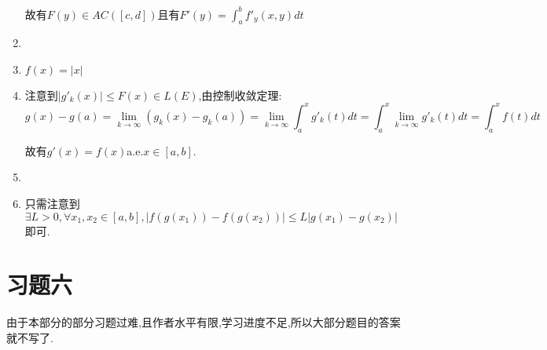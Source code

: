 \documentclass[UTF8, a4paper, 12pt, oneside, onecolumn]{article}
\numberwithin{equation}{section}
\numberwithin{figure}{section}
\numberwithin{table}{section}
\theoremstyle{nonumberplain}	%
\theoremstyle{plain}	%
\theoremstyle{plain}	%
\theoremstyle{plain}	%
\theoremstyle{plain}	%
\theoremstyle{nonumberplain}
\begin{document}
\begin{enumerate}
	故有$F(y)\in AC([c,d])$且有$\displaystyle F'(y)=\int_{a}^{b} f'_y(x,y)dt $
	\item %
	\item $\displaystyle f(x)=|x|$
	\item 注意到$|g'_k(x)|\leqslant F(x)\in L(E)$,由控制收敛定理:
	$$\displaystyle g(x)-g(a)=\lim_{k\rightarrow \infty}( g_k(x)-g_k(a) )=\lim_{k\rightarrow \infty}\int_a^x g'_k(t)dt=\int_a^x\lim_{k\rightarrow \infty} g'_k(t)dt=\int_a^x f(t)dt$$
	
	故有$g'(x)=f(x)$a.e.$x\in [a,b]$.
	\item 
	\item 只需注意到$\exists L>0,\forall x_1,x_2\in[a,b],|f(g(x_1))-f(g(x_2))|\leqslant L|g(x_1)-g(x_2)|$即可.
\end{enumerate}

\part{习题六}
由于本部分的部分习题过难,且作者水平有限,学习进度不足,所以大部分题目的答案就不写了.
\end{document}
